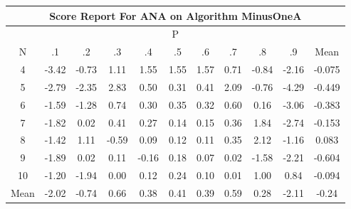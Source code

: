 \documentclass[11pt,a4paper]{report}
\begin{document}
\begin{longtable}{ | c || c | c | c | c | c | c | c | c | c || c |}
\hline
\multicolumn{11}{|c|}{ Score Report For ANA on Algorithm MinusOneA} \\
\hline
\multicolumn{11}{|c|}{ P } \\
\hline
N & .1 & .2 & .3 & .4 & .5 & .6 & .7 & .8 & .9 & Mean\\
 \hline
 \hline
 \endhead
  4 &  \cellcolor[HTML]{FFA7A7} -3.42 &  \cellcolor[HTML]{FFEFEF} -0.73 &  \cellcolor[HTML]{DFDFFF} 1.11 &  \cellcolor[HTML]{D7D7FF} 1.55 &  \cellcolor[HTML]{D7D7FF} 1.55 &  \cellcolor[HTML]{D7D7FF} 1.57 &  \cellcolor[HTML]{EFEFFF} 0.71 &  \cellcolor[HTML]{FFE7E7} -0.84 &  \cellcolor[HTML]{FFC7C7} -2.16 & -0.075 \\
  5 &  \cellcolor[HTML]{FFB7B7} -2.79 &  \cellcolor[HTML]{FFC7C7} -2.35 &  \cellcolor[HTML]{B7B7FF} 2.83 &  \cellcolor[HTML]{EFEFFF} 0.50 &  \cellcolor[HTML]{F7F7FF} 0.31 &  \cellcolor[HTML]{F7F7FF} 0.41 &  \cellcolor[HTML]{C7C7FF} 2.09 &  \cellcolor[HTML]{FFEFEF} -0.76 &  \cellcolor[HTML]{FF8F8F} -4.29 & -0.449 \\
  6 &  \cellcolor[HTML]{FFD7D7} -1.59 &  \cellcolor[HTML]{FFDFDF} -1.28 &  \cellcolor[HTML]{EFEFFF} 0.74 &  \cellcolor[HTML]{F7F7FF} 0.30 &  \cellcolor[HTML]{F7F7FF} 0.35 &  \cellcolor[HTML]{F7F7FF} 0.32 &  \cellcolor[HTML]{EFEFFF} 0.60 &  \cellcolor[HTML]{F7F7FF} 0.16 &  \cellcolor[HTML]{FFAFAF} -3.06 & -0.383 \\
  7 &  \cellcolor[HTML]{FFCFCF} -1.82 &  \cellcolor[HTML]{FFFFFF} 0.02 &  \cellcolor[HTML]{F7F7FF} 0.41 &  \cellcolor[HTML]{F7F7FF} 0.27 &  \cellcolor[HTML]{FFFFFF} 0.14 &  \cellcolor[HTML]{FFFFFF} 0.15 &  \cellcolor[HTML]{F7F7FF} 0.36 &  \cellcolor[HTML]{CFCFFF} 1.84 &  \cellcolor[HTML]{FFB7B7} -2.74 & -0.153 \\
  8 &  \cellcolor[HTML]{FFDFDF} -1.42 &  \cellcolor[HTML]{DFDFFF} 1.11 &  \cellcolor[HTML]{FFEFEF} -0.59 &  \cellcolor[HTML]{FFFFFF} 0.09 &  \cellcolor[HTML]{FFFFFF} 0.12 &  \cellcolor[HTML]{FFFFFF} 0.11 &  \cellcolor[HTML]{F7F7FF} 0.35 &  \cellcolor[HTML]{C7C7FF} 2.12 &  \cellcolor[HTML]{FFDFDF} -1.16 & 0.083 \\
  9 &  \cellcolor[HTML]{FFCFCF} -1.89 &  \cellcolor[HTML]{FFFFFF} 0.02 &  \cellcolor[HTML]{FFFFFF} 0.11 &  \cellcolor[HTML]{FFFFFF} -0.16 &  \cellcolor[HTML]{F7F7FF} 0.18 &  \cellcolor[HTML]{FFFFFF} 0.07 &  \cellcolor[HTML]{FFFFFF} 0.02 &  \cellcolor[HTML]{FFD7D7} -1.58 &  \cellcolor[HTML]{FFC7C7} -2.21 & -0.604 \\
  10 &  \cellcolor[HTML]{FFDFDF} -1.20 &  \cellcolor[HTML]{FFCFCF} -1.94 &  \cellcolor[HTML]{FFFFFF} 0.00 &  \cellcolor[HTML]{FFFFFF} 0.12 &  \cellcolor[HTML]{F7F7FF} 0.24 &  \cellcolor[HTML]{FFFFFF} 0.10 &  \cellcolor[HTML]{FFFFFF} 0.01 &  \cellcolor[HTML]{E7E7FF} 1.00 &  \cellcolor[HTML]{E7E7FF} 0.84 & -0.094 \\
 \hline
 \hline
Mean &  \cellcolor[HTML]{FFCFCF} -2.02 &  \cellcolor[HTML]{FFEFEF} -0.74 &  \cellcolor[HTML]{EFEFFF} 0.66 &  \cellcolor[HTML]{F7F7FF} 0.38 &  \cellcolor[HTML]{F7F7FF} 0.41 &  \cellcolor[HTML]{F7F7FF} 0.39 &  \cellcolor[HTML]{EFEFFF} 0.59 &  \cellcolor[HTML]{F7F7FF} 0.28 &  \cellcolor[HTML]{FFC7C7} -2.11 &  \cellcolor[HTML]{FFF7F7} -0.24
\end{longtable}
\end{document}
